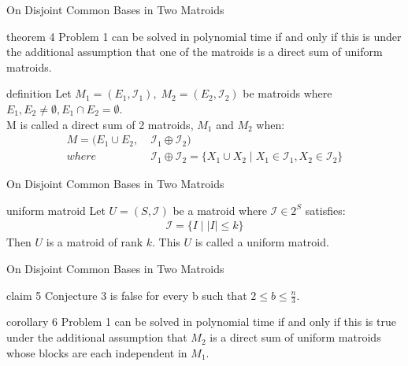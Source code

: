 \documentclass[11pt,xcolor=dvipsnames,table,dvipdfmx]{beamer}
\begin{document}
\begin{frame}{On Disjoint Common Bases in Two Matroids}
 \begin{block}{theorem 4}
  Problem 1 can be solved in polynomial time if and only if this is under the additional assumption that one of the matroids is a direct sum of uniform matroids.
 \end{block}
 \begin{block}{definition}
  Let $M_1 = (E_1, \mathcal{I}_1),\; M_2 = (E_2, \mathcal{I}_2)$ be matroids where $E_1 , E_2 \neq \emptyset , E_1 \cap E_2 = \emptyset$.\\
  M is called a \alert{direct sum} of 2 matroids, $M_1$ and $M_2$ when:
  \begin{align*}
   M = (E_1 \cup E_2 ,\; &\mathcal{I}_1 \oplus \mathcal{I}_2) \\
   where\; &\mathcal{I}_1 \oplus \mathcal{I}_2 = \{X_1 \cup X_2\; |\; X_1 \in \mathcal{I}_1, X_2 \in \mathcal{I}_2\}
  \end{align*}
 \end{block}
\end{frame}

\begin{frame}{On Disjoint Common Bases in Two Matroids}
 \begin{exampleblock}{uniform matroid}
  Let $U = (S, \mathcal{I})$ be a matroid where $\mathcal{I} \in 2^S$ satisfies:
  \begin{align*}
   \mathcal{I} = \{I\;|\;|I| \leq k\}
  \end{align*}
  Then $U$ is a matroid of rank $k$. This $U$ is called a \alert{uniform matroid}.
 \end{exampleblock}
\end{frame}

\begin{frame}{On Disjoint Common Bases in Two Matroids}
 \begin{block}{claim 5}
  Conjecture 3 is false for every b such that $2 \leq b \leq \frac{n}{3}$.
 \end{block}
 \begin{block}{corollary 6}
  Problem 1 can be solved in polynomial time if and only if this is true under the additional assumption that $M_2$ is a direct sum of uniform matroids whose blocks are each independent in $M_1$.
 \end{block}
\end{frame}
\end{document}
